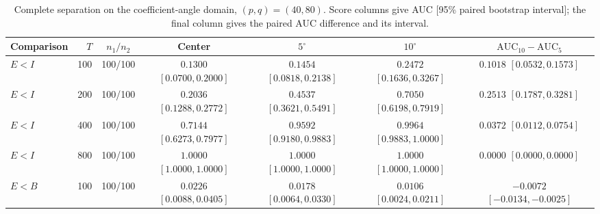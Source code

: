 \documentclass[12pt,letterpaper]{article}
\def\spacingset#1{\renewcommand{\baselinestretch}{#1}\small\normalsize}
\theoremstyle{plain}
\theoremstyle{definition}
\begin{document}
\begin{table}[p]
\begingroup
\spacingset{1.0}
\small\centering
\caption{Complete separation on the coefficient-angle domain, $(p,q)=(40,80)$. Score columns give AUC [95\% paired bootstrap interval]; the final column gives the paired AUC difference and its interval.}
\label{s23:lambda:allauc:p40q80}
\footnotesize
\setlength{\tabcolsep}{3.5pt}
\renewcommand{\arraystretch}{1.10}
\begin{adjustbox}{max width=\linewidth}
\begin{tabular}{lrccccc}
\toprule
Comparison & $T$ & $n_1/n_2$ & Center & $5^\circ$ & $10^\circ$ & $\mathrm{AUC}_{10}-\mathrm{AUC}_{5}$\\
\midrule
$E<I$ & 100 & 100/100 & \shortstack{$0.1300$\\{\scriptsize$[0.0700,0.2000]$}} & \shortstack{$0.1454$\\{\scriptsize$[0.0818,0.2138]$}} & \shortstack{$0.2472$\\{\scriptsize$[0.1636,0.3267]$}} & \shortstack{$0.1018$\\{\scriptsize$[0.0532,0.1573]$}}\\
$E<I$ & 200 & 100/100 & \shortstack{$0.2036$\\{\scriptsize$[0.1288,0.2772]$}} & \shortstack{$0.4537$\\{\scriptsize$[0.3621,0.5491]$}} & \shortstack{$0.7050$\\{\scriptsize$[0.6198,0.7919]$}} & \shortstack{$0.2513$\\{\scriptsize$[0.1787,0.3281]$}}\\
$E<I$ & 400 & 100/100 & \shortstack{$0.7144$\\{\scriptsize$[0.6273,0.7977]$}} & \shortstack{$0.9592$\\{\scriptsize$[0.9180,0.9883]$}} & \shortstack{$0.9964$\\{\scriptsize$[0.9883,1.0000]$}} & \shortstack{$0.0372$\\{\scriptsize$[0.0112,0.0754]$}}\\
$E<I$ & 800 & 100/100 & \shortstack{$1.0000$\\{\scriptsize$[1.0000,1.0000]$}} & \shortstack{$1.0000$\\{\scriptsize$[1.0000,1.0000]$}} & \shortstack{$1.0000$\\{\scriptsize$[1.0000,1.0000]$}} & \shortstack{$0.0000$\\{\scriptsize$[0.0000,0.0000]$}}\\
\addlinespace
$E<B$ & 100 & 100/100 & \shortstack{$0.0226$\\{\scriptsize$[0.0088,0.0405]$}} & \shortstack{$0.0178$\\{\scriptsize$[0.0064,0.0330]$}} & \shortstack{$0.0106$\\{\scriptsize$[0.0024,0.0211]$}} & \shortstack{$-0.0072$\\{\scriptsize$[-0.0134,-0.0025]$}}\\

\end{tabular}
\end{adjustbox}
\end{table}
\end{document}

